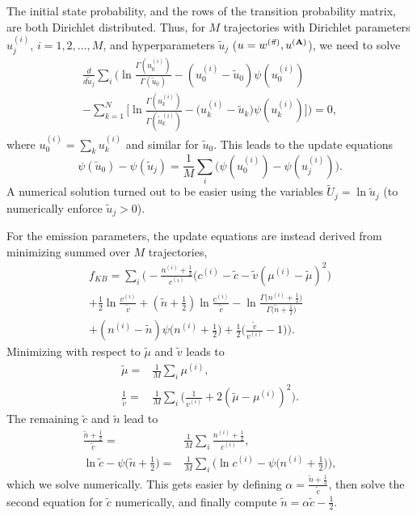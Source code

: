 The initial state probability, and the rows of the transition
probability matrix, are both Dirichlet distributed. Thus, for $M$
trajectories with Dirichlet parameters $u_j^{(i)}$, $i=1,2,\ldots,M$,
and hyperparameters $\tilde{u}_j$ ($u = w^{(\vec\pi)},u^{(\mathbf{A})}$),
we need to solve
\begin{multline}
\frac{d}{d \tilde u_j} \sum_i\Bigg( 
 \ln\frac{\Gamma(u_0^{(i)})}{\Gamma(\tilde u_0)}
    -(u_0^{(i)}-\tilde u_0)\psi(u_0^{(i)})\\
    -\sum_{k=1}^N\bigg[
      \ln\frac{\Gamma(u_k^{(i)})}{\Gamma(\tilde u_k^{(i)})}
      -\big(u_k^{(i)}-\tilde u_k\big)
      \psi(u_k^{(i)})\bigg]\Bigg)=0,
\end{multline}
where $u_0^{(i)}=\sum_ku_k^{(i)}$ and similar for $\tilde u_0$. This
leads to the update equations
\begin{equation}
  \psi(\tilde u_0)-\psi(\tilde u_j)
=\frac{1}{M}\sum_i\bigg(
  \psi(u_0^{(i)})-\psi(u_j^{(i)})\bigg).
\end{equation}
A numerical solution turned out to be easier using the variables
$\tilde U_j=\ln \tilde u_j$ (to numerically enforce $\tilde u_j>0$).

For the emission parameters, the update equations are instead derived
from minimizing  summed over $M$ trajectories,
\begin{multline}
  f_{KB}=\sum_i\Bigg(
  -\frac{n^{(i)}+\frac 12}{c^{(i)}} \Big(c^{(i)}-\tilde c-\tilde v(\mu^{(i)}-\tilde
  \mu)^2\Big)\\ +\frac 12\ln\frac{v^{(i)}}{\tilde v} +(\tilde
  n+\frac 12)\ln\frac{c^{(i)}}{\tilde c}
  -\ln\frac{\Gamma\big(n^{(i)}+\frac 12\big)}{\Gamma\big(\tilde n+\frac
    12\big)}\\ +(n^{(i)}-\tilde n)\psi\big(n^{(i)}+\frac 12\big)
  +\frac{1}{2}\Big(\frac{\tilde v}{v^{(i)}} -1\Big)\Bigg).
\end{multline}
Minimizing with respect to $\tilde\mu$ and $\tilde v$ leads to
\begin{align}
   \tilde\mu=&\frac{1}{M}\sum_i\mu^{(i)},\\
   \frac{1}{\tilde v}=&
   \frac{1}{M}\sum_i\Big(\frac{1}{v^{(i)}}+2(\tilde\mu-\mu^{(i)})^2\Big).
\end{align}
The remaining $\tilde c$ and $\tilde n$ lead to
\begin{align}
  \frac{\tilde n+\frac 12}{\tilde c}=&
  \frac{1}{M}\sum_i\frac{n^{(i)}+\frac 12}{c^{(i)}},\\
  \ln\tilde c-\psi\big(\tilde n+\frac 12\big)=&
  \frac{1}{M}\sum_i\bigg(
\ln c^{(i)}-\psi\big(n^{(i)}+\frac 12\big)\bigg),
\end{align}
which we solve numerically. This gets easier by defining
$\alpha=\frac{\tilde n+\frac 12}{\tilde c}$, then solve the second
equation for $\tilde c$ numerically, and finally compute $\tilde
n=\alpha\tilde c-\frac 12$.
